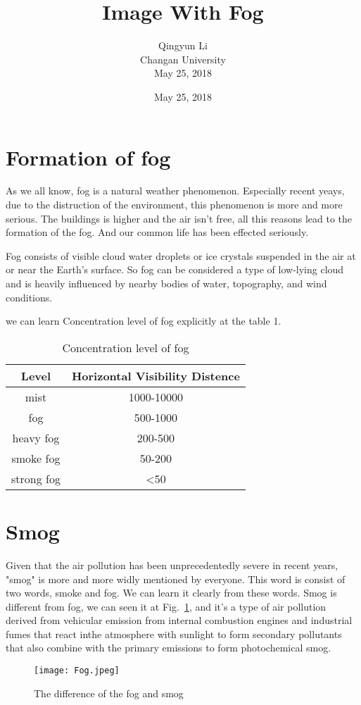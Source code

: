 \documentclass[10pt,twocolumn,letterpaper]{article}
\author{Qingyun Li\\
Changan University\\
May 25, 2018}
\date{May 25, 2018}
\title{Image With Fog}
\begin{document}
\maketitle

\section{Formation of fog}
 \par As we all know, fog is a natural weather phenomenon. Especially recent yeays, due to the distruction of the   environment, this phenomenon is more and more serious. The buildings is higher and the air isn't free, all this reasons lead to the formation of the fog. And our common life has been effected seriously. 
 \par Fog consists of visible cloud water droplets or ice crystals suspended in the air at or near the Earth's surface\cite{gultepe2008fog}. So fog can be considered a type of low-lying cloud and is heavily influenced by nearby bodies of water, topography, and wind conditions.
 \par we can learn Concentration level of fog explicitly at the table 1.
\begin{table}[htbp]
\centering
\caption{Concentration level of fog}
\begin{tabular}{c|c}
\hline
Level & Horizontal Visibility Distence \\
\hline
mist & 1000-10000 \\
fog & 500-1000 \\
heavy fog & 200-500 \\
smoke fog & 50-200 \\
strong fog & <50 \\
\hline 
\end{tabular} 
\end{table}
\section{Smog}
 \par Given that the air pollution has been unprecedentedly severe in recent years, "smog" is more and more widly mentioned by everyone. This word is consist of two words, smoke and fog. We can learn it clearly from these words. Smog is different from fog, we can seen it at Fig.~\ref{difference}, and it's a type of air pollution derived from vehicular emission from internal combustion engines and industrial fumes that react inthe atmosphere with sunlight to form secondary pollutants that also combine with the primary emissions to form photochemical smog.
\begin{figure}[t]
\begin{center}
\texttt{[image: Fog.jpeg]} %
\end{center}
   \caption{The difference of the fog and smog}
\label{difference}
\end{figure}
\end{document}
